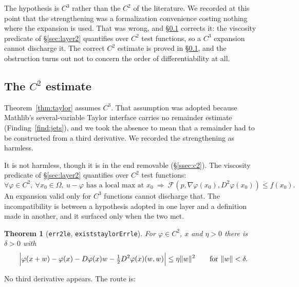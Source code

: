 \documentclass[11pt,reqno]{amsart}
\newcommand{\LEANREF}[1]{\texttt{\small\def\_{\textunderscore\allowbreak}#1}}
\newcommand{\viscF}{\ensuremath{\mathcal{F}}}
\DeclarePairedDelimiter{\norm}{\lVert}{\rVert}
\theoremstyle{plain}
\newtheorem{theorem}{Theorem}[section]
\theoremstyle{definition}
\begin{document}
The hypothesis is $C^3$ rather than the $C^2$ of the literature. We recorded
at this point that the strengthening was a formalization convenience costing
nothing where the expansion is used. That was wrong, and
\S\ref{ssec:cTwo} corrects it: the viscosity predicate of \S\ref{sec:layer2}
quantifies over $C^2$ test functions, so a $C^3$ expansion cannot discharge
it. The correct $C^2$ estimate is proved in \S\ref{ssec:cTwo}, and the
obstruction turns out not to concern the order of differentiability at all.

\subsection{The \texorpdfstring{$C^2$}{C2} estimate}\label{ssec:cTwo}

Theorem~\ref{thm:taylor} assumes $C^3$. That assumption was adopted because
Mathlib's several-variable Taylor interface carries no remainder estimate
(Finding~\ref{find:jets}), and we took the absence to mean that a remainder had
to be constructed from a third derivative. We recorded the strengthening as
harmless.

It is not harmless, though it is in the end removable (\S\ref{ssec:c2}).
The viscosity predicate of \S\ref{sec:layer2} quantifies
over $C^2$ test functions:
\[
  \forall \varphi \in C^2,\ \forall x_0 \in \Omega,\
  \text{$u - \varphi$ has a local max at $x_0$}
  \ \Longrightarrow\ \viscF(p, \nabla\varphi(x_0), D^2\varphi(x_0)) \le f(x_0).
\]
An expansion valid only for $C^3$ functions cannot discharge that. The
incompatibility is between a hypothesis adopted in one layer and a definition
made in another, and it surfaced only when the two met.

\begin{theorem}[\LEANREF{err2\_le}, \LEANREF{exists\_taylorErr\_le}]
\label{thm:ctwo}
For $\varphi \in C^2$, $x$ and $\eta > 0$ there is $\delta > 0$ with
\[
  \Bigl\lvert \varphi(x+w) - \varphi(x) - D\varphi(x)w
    - \tfrac12 D^2\varphi(x)(w,w) \Bigr\rvert \le \eta \norm{w}^2
  \qquad\text{for } \norm{w} < \delta .
\]
\end{theorem}

No third derivative appears. The route is:
\end{document}
